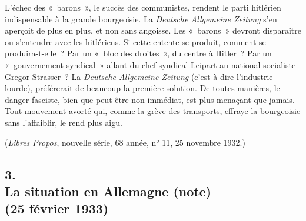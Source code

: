 \documentclass[french,twoside]{book} %
\begin{document}
L'échec des « barons », le succès des communistes, rendent le parti hitlé­rien indispensable à la grande bourgeoisie. La {\itshape Deutsche Allgemeine Zeitung} s'en aperçoit de plus en plus, et non sans angoisse. Les « barons » devront disparaître ou s'entendre avec les hitlériens. Si cette entente se produit, comment se produira-t-elle ? Par un « bloc des droites », du centre à Hitler ? Par un « gouvernement syndical » allant du chef syndical Leipart au national-socialiste Gregor Strasser ? La {\itshape Deutsche Allgemeine Zeitung} (c'est-à-dire l'industrie lourde), préférerait de beaucoup la première solution. De toutes manières, le danger fasciste, bien que peut-être non immédiat, est plus mena­çant que jamais. Tout mouvement avorté qui, comme la grève des transports, effraye la bourgeoisie sans l'affaiblir, le rend plus aigu.\par
({\itshape Libres Propos}, nouvelle série, 68 année, n° 11, 25 novembre 1932.)\par

\begin{center}
\end{center}
\subsection[3. La situation en Allemagne (note) (25 février 1933)]{3. \\
La situation en Allemagne (note) \\
(25 février 1933)}
\noindent \par
\end{document}
